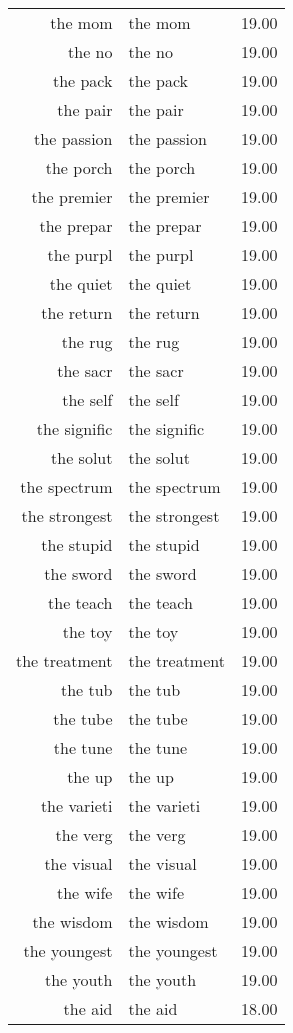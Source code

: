 \begin{table}[ht]
\begin{tabular}{rlr}
  the mom & the mom & 19.00 \\ 
  the no & the no & 19.00 \\ 
  the pack & the pack & 19.00 \\ 
  the pair & the pair & 19.00 \\ 
  the passion & the passion & 19.00 \\ 
  the porch & the porch & 19.00 \\ 
  the premier & the premier & 19.00 \\ 
  the prepar & the prepar & 19.00 \\ 
  the purpl & the purpl & 19.00 \\ 
  the quiet & the quiet & 19.00 \\ 
  the return & the return & 19.00 \\ 
  the rug & the rug & 19.00 \\ 
  the sacr & the sacr & 19.00 \\ 
  the self & the self & 19.00 \\ 
  the signific & the signific & 19.00 \\ 
  the solut & the solut & 19.00 \\ 
  the spectrum & the spectrum & 19.00 \\ 
  the strongest & the strongest & 19.00 \\ 
  the stupid & the stupid & 19.00 \\ 
  the sword & the sword & 19.00 \\ 
  the teach & the teach & 19.00 \\ 
  the toy & the toy & 19.00 \\ 
  the treatment & the treatment & 19.00 \\ 
  the tub & the tub & 19.00 \\ 
  the tube & the tube & 19.00 \\ 
  the tune & the tune & 19.00 \\ 
  the up & the up & 19.00 \\ 
  the varieti & the varieti & 19.00 \\ 
  the verg & the verg & 19.00 \\ 
  the visual & the visual & 19.00 \\ 
  the wife & the wife & 19.00 \\ 
  the wisdom & the wisdom & 19.00 \\ 
  the youngest & the youngest & 19.00 \\ 
  the youth & the youth & 19.00 \\ 
  the aid & the aid & 18.00 \\ 

\end{tabular}
\end{table}
